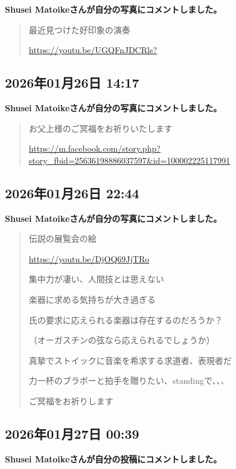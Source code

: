 \textbf{Shusei Matoikeさんが自分の写真にコメントしました。}

\begin{quote}
最近見つけた好印象の演奏

\url{https://youtu.be/UGQFnJDCRls?}
\end{quote}

\subsection*{2026年01月26日 14:17}

\textbf{Shusei Matoikeさんが自分の写真にコメントしました。}

\begin{quote}
お父上様のご冥福をお祈りいたします

\url{https://m.facebook.com/story.php?story_fbid=25636198886037597&id=100002225117991}
\end{quote}

\subsection*{2026年01月26日 22:44}

\textbf{Shusei Matoikeさんが自分の写真にコメントしました。}

\begin{quote}
伝説の展覧会の絵

\url{https://youtu.be/DjOQ69JjTRo}

集中力が凄い、人間技とは思えない

楽器に求める気持ちが大き過ぎる

氏の要求に応えられる楽器は存在するのだろうか？

（オーガスチンの弦なら応えられるでしょうか）

真摯でストイックに音楽を希求する求道者、表現者だ

力一杯のブラボーと拍手を贈りたい、standingで、、、

ご冥福をお祈りします
\end{quote}

\subsection*{2026年01月27日 00:39}

\textbf{Shusei Matoikeさんが自分の投稿にコメントしました。}

